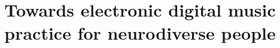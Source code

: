 \documentclass{acm_proc_article-sp}
\begin{document}
\title{Towards electronic digital music practice for neurodiverse people}
%
%
%
%
%
\end{document}
